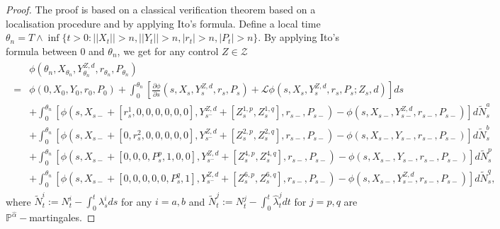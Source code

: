 \documentclass[10pt,a4paper]{amsart}
\begin{document}
\begin{proof}
\label{proof:verification}
   The proof is based on a classical verification theorem based on a localisation procedure and by applying Ito's formula. Define a local time $\theta_n =T \wedge \inf\{ t>0:||X_t|| >n, ||Y_t|| >n ,|r_t| >n, |P_t| >n \}$. By applying Ito's formula between $0$ and $\theta_n$, we get for any control $Z\in \mathcal Z$ \begin{align}
    \begin{split}
    &\phi(\theta_n,X_{\theta_n},Y^{Z,d}_{\theta_n}, r_{\theta_n},P_{\theta_n}) \\
    = &\phi(0,X_0,Y_0,r_0,P_0) + \int_0^{\theta_n}[ \frac{\partial \phi}{\partial s} (s, X_s, Y^{Z,d}_s,r_s,P_s) +\mathcal L\phi (s, X_s, Y^{Z,d}_s,r_s,P_s; Z_s, d)]ds\\
    &+ \int_0^{\theta_n} [\phi(s,X_{s-}+[r^1_s , 0,0, 0,0,0,0],Y^{Z,d}_{s^-} +[Z^{1,p}_s,Z^{1,q}_s],r_{s-},P_{s-})  - \phi(s,X_{s-},Y^{Z,d}_{s-},r_{s-},P_{s-})]  d\tilde N_s^a\\
    &+ \int_0^{\theta_n} [\phi(s,X_{s-}+[0 , r^2_s,0, 0,0,0,0],Y^{Z,d}_{s^-} +[Z^{2,p}_s,Z^{2,q}_s],r_{s-},P_{s-})  - \phi(s,X_{s-},Y_{s-},r_{s-},P_{s-})]  d\tilde  N_s^b\\
    &+ \int_0^{\theta_n} [\phi(s,X_{s-}+[0 , 0,0, P_s^p,1,0,0],Y^{Z,d}_{s^-} +[Z^{4,p}_s,Z^{4,q}_s],r_{s-},P_{s-})  - \phi(s,X_{s-},Y_{s-},r_{s-},P_{s-})]  d\tilde  N_s^p\\
    &+ \int_0^{\theta_n} [\phi(s,X_{s-}+[0 , 0,0, 0,0,P_s^q,1],Y^{Z,d}_{s^-} +[Z^{6,p}_s,Z^{6,q}_s],r_{s-},P_{s-})  - \phi(s,X_{s-},Y^{Z,d}_{s-},r_{s-},P_{s-})]  d\tilde  N_s^q,
    \end{split}
    \label{eq:phi_ito}
\end{align}
where $\tilde N^i_t:=N^i_t-\int_0^t\lambda^i_sds$ for any $i=a,b$ and $\tilde N^j_t:=N^j_t-\int_0^t\hat\lambda^j_tdt$ for $j=p,q$ are $\mathbb P^{\hat\alpha}-$martingales.

\end{proof}
\end{document}

